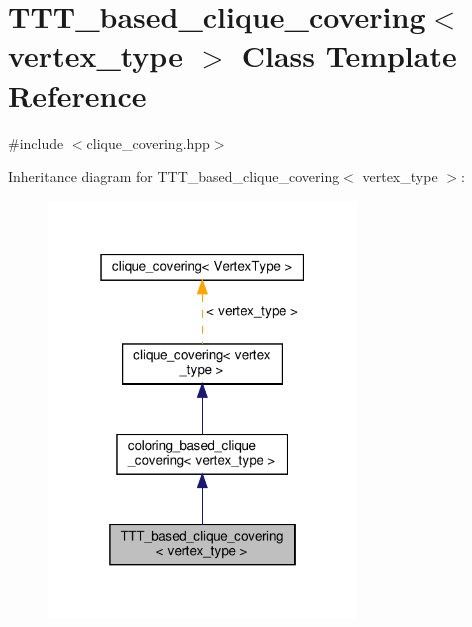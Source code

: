 \hypertarget{classTTT__based__clique__covering}{}\section{T\+T\+T\+\_\+based\+\_\+clique\+\_\+covering$<$ vertex\+\_\+type $>$ Class Template Reference}
\label{classTTT__based__clique__covering}


{\ttfamily \#include $<$clique\+\_\+covering.\+hpp$>$}



Inheritance diagram for T\+T\+T\+\_\+based\+\_\+clique\+\_\+covering$<$ vertex\+\_\+type $>$\+:
\nopagebreak
\begin{figure}[H]
\begin{center}
\leavevmode
\includegraphics[width=232pt]{de/d5f/classTTT__based__clique__covering__inherit__graph}
\end{center}
\end{figure}


